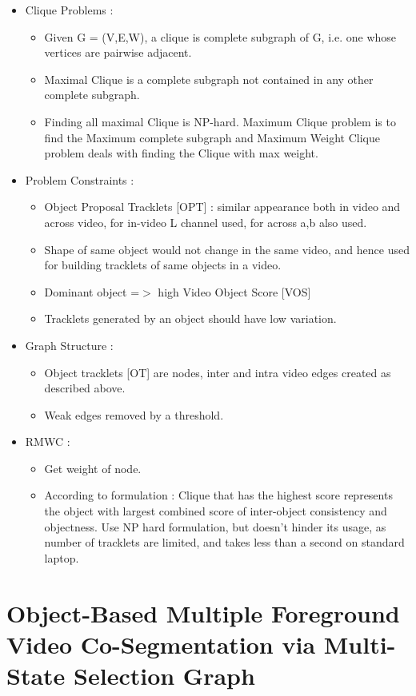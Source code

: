 \documentclass{article}
\begin{document}
\begin{itemize}
\item Clique Problems :
  \begin{itemize}
  \item Given G = (V,E,W), a clique is complete subgraph of G, i.e. one whose vertices are pairwise adjacent.
  \item Maximal Clique is a complete subgraph not contained in any other complete subgraph.
  \item Finding all maximal Clique is NP-hard. Maximum Clique problem is to find the  Maximum complete subgraph and Maximum Weight Clique problem deals with finding the Clique with max weight.
  \end{itemize}
\item Problem Constraints :
  \begin{itemize}
  \item Object Proposal Tracklets [OPT] : similar appearance both in video and across video, for in-video L channel used, for across a,b also used.
  \item Shape of same object would not change in the same video, and hence used for building tracklets of same objects in a video.
  \item Dominant object =$>$ high Video Object Score [VOS]
  \item Tracklets generated by an object should have low variation.
  \end{itemize}
\item Graph Structure :
  \begin{itemize}
  \item Object tracklets [OT] are nodes, inter and intra video edges created as described above.
  \item Weak edges removed by a threshold.
  \end{itemize}
\item RMWC :
  \begin{itemize}
  \item Get weight of node.
  \item According to formulation : Clique that has the highest score represents the object with largest combined score of inter-object consistency and objectness. Use NP hard formulation, but doesn't hinder its usage, as number of tracklets are limited, and takes less than a second on standard laptop.
  \end{itemize}
\end{itemize}

\section{Object-Based Multiple Foreground Video Co-Segmentation via Multi-State Selection Graph}
\cite{7120111}




\end{document}
